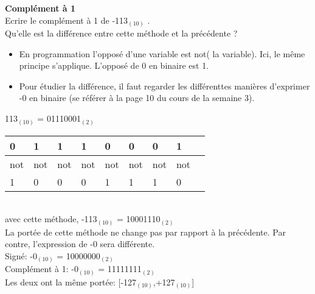 \begin{Exercice}[5 minutes] \textbf{Complément à 1}\\
    Ecrire le complément à 1 de -113$_{(10)}$ . \\

	Qu'elle est la différence entre cette méthode et la précédente ? \\

    \begin{conseil}
        \begin{itemize}
        	\item En programmation l'opposé d'une variable est not( la variable). Ici, le même principe s'applique. L'opposé de 0 en binaire est 1.
        	\item Pour étudier la différence, il faut regarder les différenttes manières d'exprimer -0 en binaire (se référer à la page 10 du cours de la semaine 3).
        \end{itemize} 
    \end{conseil}
    
    \begin{solution}
    	113$_{(10)}$ = 01110001$_{(2)}$ \\
    	
        \begin{tabular}{| p{1cm} | p{1cm} | p{1cm} | p{1cm} | p{1cm} | p{1cm} | p{1cm} | p{1cm} | p{1cm} |} 
            \hline
            0 & 1 & 1 & 1 & 0 & 0 & 0 & 1 \\ [0.5ex] 
            \hline
            not & not & not & not & not & not & not & not \\ [0.5ex]
            \hline
            1 & 0 & 0 & 0 & 1 & 1 & 1 & 0 \\ [0.5ex]
            \hline
        \end{tabular} \\
        
        avec cette méthode, -113$_{(10)}$ = 10001110$_{(2)}$ \\
        
        La portée de cette méthode ne change pas par rapport à la précédente. Par contre, l'expression de -0 sera différente.\\
        
        Signé: -0$_{(10)}$ = 10000000$_{(2)}$ \\
        
        Complément à 1: -0$_{(10)}$ = 11111111$_{(2)}$ \\
        
        Les deux ont la même portée: [-127$_{(10)}$,+127$_{(10)}$] \\
        
    \end{solution}
\end{Exercice}

